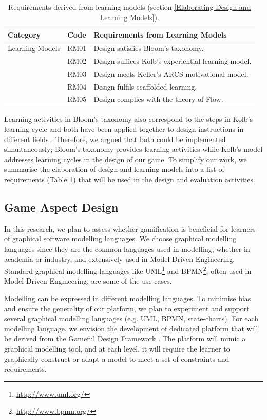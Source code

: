 \documentclass[12pt, a4paper]{report} \usepackage[titletoc]{appendix}
\begin{document}
\begin{appendices}
\begin{table}[ht]
\caption{Requirements derived from learning models (section \ref{Elaborating Design and Learning Models}).}
\label{design-learning-models}
\begin{center}
\begin{tabular}{ p{2cm}p{1cm}p{10cm} } 
\hline
Category & Code & Requirements from Learning Models \\
\hline
\multirow{1}{2cm}{Learning Models} 
& RM01 & Design satisfies Bloom's taxonomy. \\
& RM02 & Design suffices Kolb's experiential learning model. \\ 
& RM03 & Design meets Keller's ARCS motivational model. \\
& RM04 & Design fulfils scaffolded learning. \\
& RM05 & Design complies with the theory of Flow. \\ 
\hline
\end{tabular}
\end{center}
\end{table}

Learning activities in Bloom's taxonomy also correspond to the steps in Kolb's learning cycle \cite{murphy2007prior} and both have been applied together to design instructions in different fields \cite{terry1993kolb, howard1996felder, schatzberg2002applying}. Therefore, we argued that both could be implemented simultaneously; Bloom's taxonomy provides learning activities while Kolb's model addresses learning cycles in the design of our game. To simplify our work, we summarise the elaboration of design and learning models into a list of requirements (Table \ref{design-learning-models}) that will be used in the design and evaluation activities.

\subsection{Game Aspect Design}
In this research, we plan to assess whether gamification is beneficial for learners of graphical software modelling languages. We choose graphical modelling languages since they are the common languages used in modelling, whether in academia or industry, and extensively used in Model-Driven Engineering. Standard graphical modelling languages like UML\footnote{\url{http://www.uml.org/}} and BPMN\footnote{\url{http://www.bpmn.org/}}, often used in Model-Driven Engineering, are some of the use-cases. 

Modelling can be expressed in different modelling languages. To minimise bias and ensure the generality of our platform, we plan to experiment and support several graphical modelling languages (e.g. UML, BPMN, state-charts). For each modelling language, we envision the development of dedicated platform that will be derived from the Gameful Design Framework \cite{deterding2015lens}. The platform will mimic a graphical modelling tool, and at each level, it will require the learner to graphically construct or adapt a model to meet a set of constraints and requirements.


\end{appendices}
\end{document}
